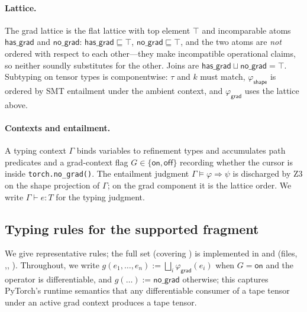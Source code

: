 \paragraph{Lattice.} The grad lattice is the flat lattice with
top element $\top$ and incomparable atoms
$\mathsf{has\_grad}$ and $\mathsf{no\_grad}$:
$\mathsf{has\_grad}\sqsubseteq\top$,
$\mathsf{no\_grad}\sqsubseteq\top$, and the two atoms are
\emph{not} ordered with respect to each other---they make
incompatible operational claims, so neither soundly substitutes
for the other. Joins are
$\mathsf{has\_grad}\sqcup\mathsf{no\_grad}=\top$. Subtyping on
tensor types is componentwise: $\tau$ and $k$ must match,
$\varphi_{\mathsf{shape}}$ is ordered by SMT entailment under the
ambient context, and $\varphi_{\mathsf{grad}}$ uses the lattice
above.

\paragraph{Contexts and entailment.} A typing context $\Gamma$
binds variables to refinement types and accumulates path
predicates and a grad-context flag $G\in\{\mathsf{on},\mathsf{off}\}$
recording whether the cursor is inside
\texttt{torch.no\_grad()}. The entailment judgment
$\Gamma\models\varphi\Rightarrow\psi$ is discharged by Z3 on the
shape projection of $\Gamma$; on the grad component it is the
lattice order. We write $\Gamma\vdash e:T$ for the typing
judgment.

\subsection{Typing rules for the supported fragment}
\label{sec:rt:rules}

We give representative rules; the full set (covering
) is
implemented in and
 (files,
,, ). Throughout,
we write $g(e_1,\dots,e_n) := \bigsqcup_i\varphi_{\mathsf{grad}}(e_i)$
when $G=\mathsf{on}$ and the operator is differentiable, and
$g(\dots):=\mathsf{no\_grad}$ otherwise; this captures PyTorch's
runtime semantics that any differentiable consumer of a tape
tensor under an active grad context produces a tape tensor.

